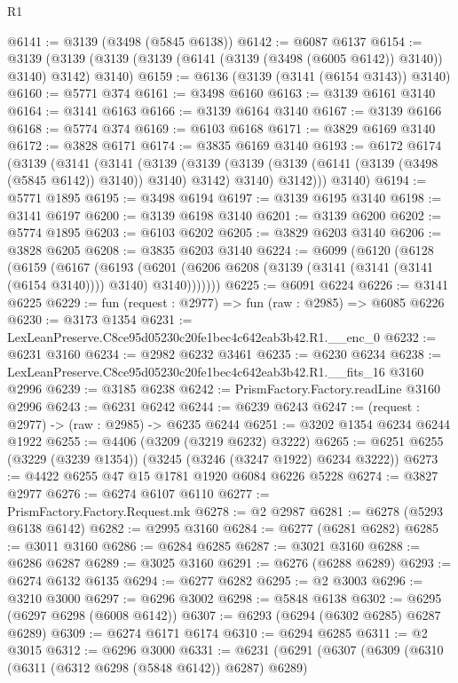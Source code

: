 \begin{lexlean}{R1}
\begin{coremodule}
@6141 := @3139 (@3498 (@5845 @6138))
@6142 := @6087 @6137
@6154 := @3139 (@3139 (@3139 (@3139 (@6141 (@3139 (@3498 (@6005 @6142)) @3140)) @3140) @3142) @3140)
@6159 := @6136 (@3139 (@3141 (@6154 @3143)) @3140)
@6160 := @5771 @374
@6161 := @3498 @6160
@6163 := @3139 @6161 @3140
@6164 := @3141 @6163
@6166 := @3139 @6164 @3140
@6167 := @3139 @6166
@6168 := @5774 @374
@6169 := @6103 @6168
@6171 := @3829 @6169 @3140
@6172 := @3828 @6171
@6174 := @3835 @6169 @3140
@6193 := @6172
    @6174
    (@3139
      (@3141
        (@3141
          (@3139
            (@3139 (@3139 (@3139 (@6141 (@3139 (@3498 (@5845 @6142)) @3140)) @3140) @3142) @3140)
            @3142)))
      @3140)
@6194 := @5771 @1895
@6195 := @3498 @6194
@6197 := @3139 @6195 @3140
@6198 := @3141 @6197
@6200 := @3139 @6198 @3140
@6201 := @3139 @6200
@6202 := @5774 @1895
@6203 := @6103 @6202
@6205 := @3829 @6203 @3140
@6206 := @3828 @6205
@6208 := @3835 @6203 @3140
@6224 := @6099
    (@6120
      (@6128
        (@6159
          (@6167
            (@6193
              (@6201 (@6206 @6208 (@3139 (@3141 (@3141 (@3141 (@6154 @3140)))) @3140) @3140)))))))
@6225 := @6091 @6224
@6226 := @3141 @6225
@6229 := fun (request : @2977) => fun (raw : @2985) => @6085 @6226
@6230 := @3173 @1354
@6231 := LexLeanPreserve.C8ce95d05230c20fe1bec4c642eab3b42.R1.__enc_0
@6232 := @6231 @3160
@6234 := @2982 @6232 @3461
@6235 := @6230 @6234
@6238 := LexLeanPreserve.C8ce95d05230c20fe1bec4c642eab3b42.R1.__fits_16 @3160 @2996
@6239 := @3185 @6238
@6242 := PrismFactory.Factory.readLine @3160 @2996
@6243 := @6231 @6242
@6244 := @6239 @6243
@6247 := (request : @2977) -> (raw : @2985) -> @6235 @6244
@6251 := @3202 @1354 @6234 @6244 @1922
@6255 := @4406 (@3209 (@3219 @6232) @3222)
@6265 := @6251 @6255 (@3229 (@3239 @1354)) (@3245 (@3246 (@3247 @1922) @6234 @3222))
@6273 := @4422 @6255 @47 @15 @1781 @1920 @6084 @6226 @5228
@6274 := @3827 @2977
@6276 := @6274 @6107 @6110
@6277 := PrismFactory.Factory.Request.mk
@6278 := @2 @2987
@6281 := @6278 (@5293 @6138 @6142)
@6282 := @2995 @3160
@6284 := @6277 (@6281 @6282)
@6285 := @3011 @3160
@6286 := @6284 @6285
@6287 := @3021 @3160
@6288 := @6286 @6287
@6289 := @3025 @3160
@6291 := @6276 (@6288 @6289)
@6293 := @6274 @6132 @6135
@6294 := @6277 @6282
@6295 := @2 @3003
@6296 := @3210 @3000
@6297 := @6296 @3002
@6298 := @5848 @6138
@6302 := @6295 (@6297 @6298 (@6008 @6142))
@6307 := @6293 (@6294 (@6302 @6285) @6287 @6289)
@6309 := @6274 @6171 @6174
@6310 := @6294 @6285
@6311 := @2 @3015
@6312 := @6296 @3000
@6331 := @6231
    (@6291
      (@6307
        (@6309
          (@6310 (@6311 (@6312 @6298 (@5848 @6142)) @6287) @6289)

\end{coremodule}
\end{lexlean}
